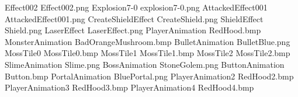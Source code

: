 Effect002
E f f e c t 0 0 2 . p n g 
 Explosion7-0
e x p l o s i o n 7 - 0 . p n g 
 AttackedEffect001
A t t a c k e d E f f e c t 0 0 1 . p n g 
 CreateShieldEffect
C r e a t e S h i e l d . p n g 
 ShieldEffect
S h i e l d . p n g 
 LaserEffect
L a s e r E f f e c t . p n g 
 PlayerAnimation
R e d H o o d . b m p 
 MonsterAnimation
B a d O r a n g e M u s h r o o m . b m p 
 BulletAnimation
B u l l e t B l u e . p n g 
 MossTile0
M o s s T i l e 0 . b m p 
 MossTile1
M o s s T i l e 1 . b m p 
 MossTile2
M o s s T i l e 2 . b m p 
 SlimeAnimation
S l i m e . p n g 
 BossAnimation
S t o n e G o l e m . p n g 
 ButtonAnimation
B u t t o n . b m p 
 PortalAnimation
B l u e P o r t a l . p n g 
 PlayerAnimation2
R e d H o o d 2 . b m p 
 PlayerAnimation3
R e d H o o d 3 . b m p 
 PlayerAnimation4
R e d H o o d 4 . b m p 
 